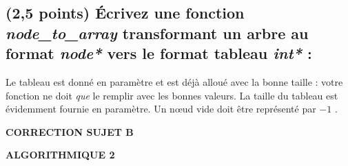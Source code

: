 \documentclass[11pt,a4paper]{article}
\newcommand{\TitreMatiere}{Algorithmique 2}
\begin{document}
\clearpage


\subsection{(2,5 points) \'Ecrivez une fonction \og \textit{node\_to\_array} \fg{} transformant un arbre au format \textit{node*} vers le format tableau \textit{int*} : }

\noindent Le tableau est donné en paramètre et est déjà alloué avec la bonne taille : votre fonction ne doit \textit{que} le remplir avec les bonnes valeurs.
La taille du tableau est évidemment fournie en paramètre.
Un nœud vide doit être représenté par \og $-1$ \fg.

\begin{center}
\end{center}




\clearpage




\vfillFirst

\begin{center}

\begin{LARGE}
\textbf{CORRECTION SUJET B}

\bigskip

\textbf{\MakeUppercase{\TitreMatiere}}
\end{LARGE}

\end{center}

\vfillLast
\end{document}
